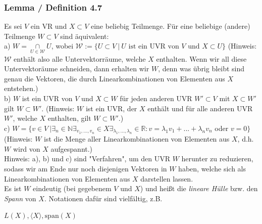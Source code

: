 \documentclass{article}
\begin{document}
\subsubsection*{Lemma / Definition 4.7}
Es sei $V$ ein VR und $X \subset V$ eine beliebig Teilmenge. Für eine beliebige (andere) Teilmenge $W \subset V$ sind äquivalent: \\
a) $W = \underset{U \in \mathcal{W}}{\cap} U$, wobei $\mathcal{W} := \{U \subset V \ | \ U \text{ ist ein UVR von } V \text{ und } X \subset U\}$ (Hinweis: $\mathcal{W}$ enthält also alle Untervektorräume, welche $X$ enthalten. Wenn wir all diese Untervektoräume schneiden, dann erhalten wir $W$, denn was übrig bleibt sind genau die Vektoren, die durch Linearkombinationen von Elementen aus $X$ entstehen.) \\
b) $W$ ist ein UVR von $V$ und $X \subset W$ für jeden anderen UVR $W' \subset V$ mit $X \subset W'$ gilt $W \subset W'$. (Hinweis: $W$ ist ein UVR, der $X$ enthält und für alle anderen UVR $W'$, welche $X$ enthalten, gilt $W \subset W'$.) \\  
c) $W = \{v \in V \ | \exists_n \in \mathbb{N} \exists_{v_1,...,v_n} \in X \exists_{\lambda_1,...,\lambda_n}\in \mathbb{R}: v = \lambda_1 v_1 + ... + \lambda_n v_n $ oder $ v=0\}$ (Hinweis: $W$ ist die Menge aller Linearkombinationen von Elementen aus $X$, d.h. $W$ wird von $X$ aufgespannt.) \\
Hinweis: a), b) und c) sind "Verfahren", um den UVR $W$ herunter zu reduzieren, sodass wir am Ende nur noch diejenigen Vektoren in $W$ haben, welche sich als Linearkombinationen von Elementen aus $X$ darstellen lassen. \\
Es ist $W$ eindeutig (bei gegebenem $V$ und $X$) und heißt die \textit{lineare Hülle} bzw. den \textit{Spann} von $X$. Notationen dafür sind vielfältig, z.B. \\
\begin{center}
    $L(X), \langle X \rangle, \text{span}(X)$
\end{center}
\end{document}
